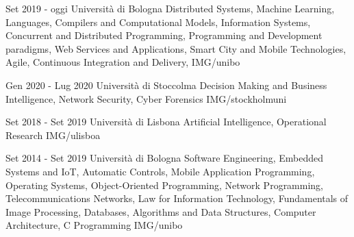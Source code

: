 \documentclass[paper=a4,fontsize=11pt]{temp} %
\begin{document}
\noindent

{Set 2019 - oggi}
{Università di Bologna}
{Distributed Systems, Machine Learning,    Languages, Compilers and Computational Models,    Information Systems,     Concurrent and Distributed Programming,    Programming and Development paradigms,    Web Services and Applications,     Smart City and Mobile Technologies,     Agile, Continuous Integration and Delivery,  } 
 {IMG/unibo}

\sepspace

{Gen 2020 - Lug 2020}
{Università di Stoccolma}
{Decision Making and Business Intelligence, Network Security, Cyber Forensics}
{IMG/stockholmuni}

\sepspace

{Set 2018 - Set 2019}
{Università di Lisbona}
{Artificial Intelligence, Operational Research} 
{IMG/ulisboa}

\sepspace

{Set 2014 - Set 2019}
{Università di Bologna}
{Software Engineering, Embedded Systems and IoT, Automatic Controls, Mobile Application Programming, Operating Systems, Object-Oriented Programming, Network Programming, Telecommunications Networks, Law for Information Technology, Fundamentals of Image Processing, Databases, Algorithms and Data Structures, Computer Architecture, C Programming} 
{IMG/unibo}
\end{document}

